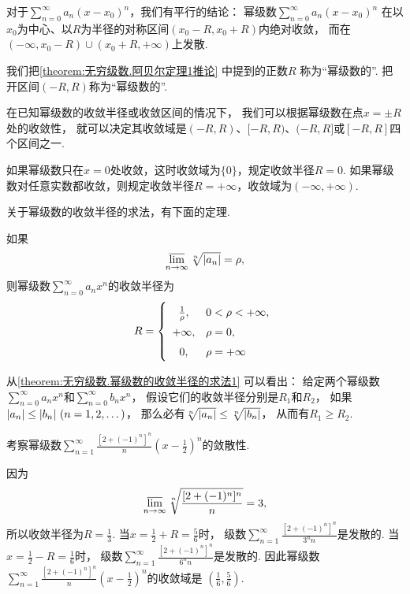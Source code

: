 对于\(\sum_{n=0}^\infty a_n (x-x_0)^n\)，我们有平行的结论：
幂级数\(\sum_{n=0}^\infty a_n (x-x_0)^n\)
在以\(x_0\)为中心、以\(R\)为半径的对称区间\((x_0-R,x_0+R)\)内绝对收敛，
而在\((-\infty,x_0-R)\cup(x_0+R,+\infty)\)上发散.

我们把\cref{theorem:无穷级数.阿贝尔定理1推论} 中提到的正数\(R\)
称为“幂级数的”.
把开区间\((-R,R)\)称为“幂级数的”.

在已知幂级数的收敛半径或收敛区间的情况下，
我们可以根据幂级数在点\(x = \pm R\)处的收敛性，
就可以决定其收敛域是\((-R,R)\)、\([-R,R)\)、\((-R,R]\)或\([-R,R]\)四个区间之一.

如果幂级数只在\(x=0\)处收敛，这时收敛域为\(\{0\}\)，规定收敛半径\(R=0\).
如果幂级数对任意实数都收敛，则规定收敛半径\(R=+\infty\)，收敛域为\((-\infty,+\infty)\).

关于幂级数的收敛半径的求法，有下面的定理.
\begin{theorem}\label{theorem:无穷级数.幂级数的收敛半径的求法1}
如果\[
	\varlimsup_{n\to\infty} \sqrt[n]{\abs{a_n}} = \rho,
\]
则幂级数\(\sum_{n=0}^\infty a_n x^n\)的收敛半径为\[
	R = \left\{ \def\arraystretch{1.5} \begin{array}{cl}
		\frac1\rho, & 0<\rho<+\infty, \\
		+\infty, & \rho = 0, \\
		0, & \rho = +\infty \\
	\end{array} \right.
\]
\end{theorem}
\begin{remark}
从\cref{theorem:无穷级数.幂级数的收敛半径的求法1} 可以看出：
给定两个幂级数\(\sum_{n=0}^\infty a_n x^n\)和\(\sum_{n=0}^\infty b_n x^n\)，
假设它们的收敛半径分别是\(R_1\)和\(R_2\)，
如果\(\abs{a_n} \leq \abs{b_n}\ (n=1,2,\dotsc)\)，
那么必有\(\sqrt[n]{\abs{a_n}} \leq \sqrt[n]{\abs{b_n}}\)，
从而有\(R_1 \geq R_2\).
\end{remark}

\begin{example}
考察幂级数\(\sum_{n=1}^\infty \frac{[2+(-1)^n]^n}{n} \left(x-\frac12\right)^n\)的敛散性.
\begin{solution}
因为\[
	\varlimsup_{n\to\infty} \sqrt[n]{\frac{[2+(-1)^n]^n}n} = 3,
\]
所以收敛半径为\(R=\frac13\).
当\(x=\frac12+R=\frac56\)时，
级数\(\sum_{n=1}^\infty \frac{[2+(-1)^n]^n}{3^n n}\)是发散的.
当\(x=\frac12-R=\frac16\)时，
级数\(\sum_{n=1}^\infty \frac{[2+(-1)^n]^n}{6^n n}\)是发散的.
因此幂级数\(\sum_{n=1}^\infty \frac{[2+(-1)^n]^n}{n} \left(x-\frac12\right)^n\)的收敛域是
\(\left(\frac16,\frac56\right)\).
\end{solution}
\end{example}


